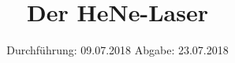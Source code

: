 

\subject{VERSUCH NUMMER 61}
\title{Der HeNe-Laser}
\date{
  Durchführung: 09.07.2018
  \hspace{3em}
  Abgabe: 23.07.2018  %
}



\thispagestyle{empty}
\maketitle
\thispagestyle{empty}
\tableofcontents
\newpage
\setcounter{page}{1}


% 



\nocite{*}
\printbibliography


